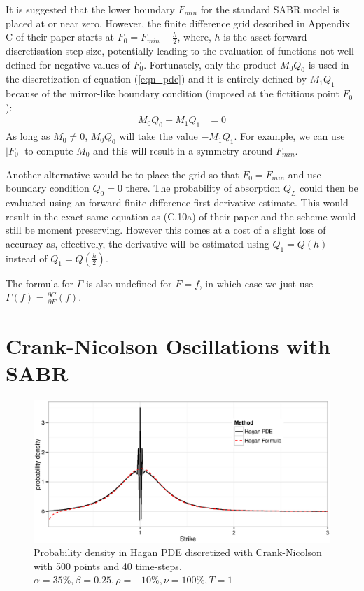 \documentclass[]{rAMF2e}
\begin{document}
It is suggested that the lower boundary $F_{min}$ for the standard SABR model is placed at or near zero. However, the finite difference grid described in Appendix C of their paper starts at  $F_0 = F_{min} - \frac{h}{2}$, where, $h$ is the asset forward discretisation step size, potentially leading to the evaluation of functions not well-defined for negative values of $F_0$. Fortunately, only the product $M_0 Q_0$ is used in the discretization of equation (\ref{eqn_pde}) and it is entirely defined by $M_1 Q_1$  because of the mirror-like boundary condition (imposed at the fictitious point $F_0$): 
\begin{align}\label{boundary_condition}
M_0 Q_0 + M_1 Q_1 &= 0
\end{align}
As long as $M_0 \neq 0$, $M_0 Q_0$ will take the value $-M_1 Q_1$. For example, we can use $|F_0|$ to compute $M_0$ and this will result in a symmetry around $F_{min}$.


Another alternative would be to place the grid so that $F_0 = F_{min}$ and use boundary condition $Q_0 = 0$ there. The probability of absorption $Q_L$ could then be evaluated using an forward finite difference first derivative estimate. This would result in the exact same equation as (C.10a) of their paper and the scheme would still be moment preserving. However this comes at a cost of a slight loss of accuracy as, effectively, the derivative will be estimated using $Q_1 = Q(h)$ instead of $Q_1 = Q(\frac{h}{2})$.

The formula for $\Gamma$ is also undefined for $F=f$, in which case we just use $\Gamma(f) = \frac{\partial C}{\partial F}(f)$.

\section{Crank-Nicolson Oscillations with SABR}\label{section_cn}
\begin{figure}[htb]
  \begin{center}  
    \includegraphics[width=12cm]{density_hagan_cn_500_40.eps}
  \end{center}
     \caption{\label{fig:density_hagan_cn_500_40} Probability density in Hagan PDE discretized with Crank-Nicolson with 500 points and 40 time-steps. $\alpha=35\%, \beta=0.25, \rho=-10\%, \nu=100\%, T=1$}
\end{figure}
\end{document}
